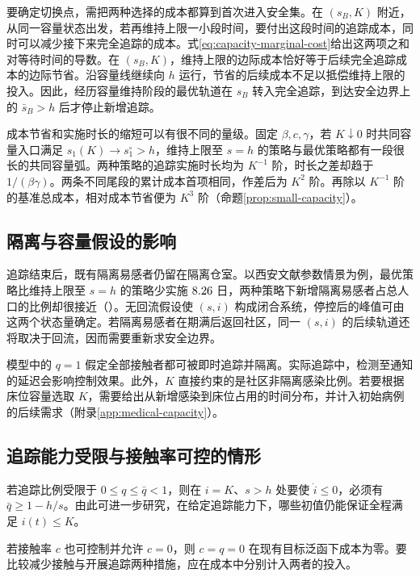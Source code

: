 \documentclass[lang=cn,a4paper,newtx]{elegantpaper}
\theoremstyle{plain}
\theoremstyle{definition}
\newcommand{\Dur}[1]{\num[round-mode=places,round-precision=2]{#1}}
\begin{document}
要确定切换点，需把两种选择的成本都算到首次进入安全集。在 $(s_B,K)$ 附近，从同一容量状态出发，若再维持上限一小段时间，要付出这段时间的追踪成本，同时可以减少接下来完全追踪的成本。式\eqref{eq:capacity-marginal-cost}给出这两项之和对等待时间的导数。在 $(s_B,K)$，维持上限的边际成本恰好等于后续完全追踪成本的边际节省。沿容量线继续向 $h$ 运行，节省的后续成本不足以抵偿维持上限的投入。因此，经历容量维持阶段的最优轨道在 $s_B$ 转入完全追踪，到达安全边界上的 $\bar s_B>h$ 后才停止新增追踪。

成本节省和实施时长的缩短可以有很不同的量级。固定 $\beta,c,\gamma$，若 $K\downarrow0$ 时共同容量入口满足 $s_1(K)\to s_1^\circ>h$，维持上限至 $s=h$ 的策略与最优策略都有一段很长的共同容量弧。两种策略的追踪实施时长均为 $K^{-1}$ 阶，时长之差却趋于 $1/(\beta\gamma)$。两条不同尾段的累计成本首项相同，作差后为 $K^2$ 阶。再除以 $K^{-1}$ 阶的基准总成本，相对成本节省便为 $K^3$ 阶（命题\ref{prop:small-capacity}）。

\subsection{隔离与容量假设的影响}
\label{sec:limitations}
追踪结束后，既有隔离易感者仍留在隔离仓室。以西安文献参数情景为例，最优策略比维持上限至 $s=h$ 的策略少实施 $\Dur{\DtimeDeltaZ}$ 日，两种策略下新增隔离易感者占总人口的比例却很接近（）。无回流假设使 $(s,i)$ 构成闭合系统，停控后的峰值可由这两个状态量确定。若隔离易感者在期满后返回社区，同一 $(s,i)$ 的后续轨道还将取决于回流，因而需要重新求安全边界。

模型中的 $q=1$ 假定全部接触者都可被即时追踪并隔离。实际追踪中，检测至通知的延迟会影响控制效果\parencite{Kretzschmar2020}。此外，$K$ 直接约束的是社区非隔离感染比例。若要根据床位容量选取 $K$，需要给出从新增感染到床位占用的时间分布，并计入初始病例的后续需求（附录\ref{app:medical-capacity}）。

\subsection{追踪能力受限与接触率可控的情形}
\label{sec:open-problems}
若追踪比例受限于 $0\le q\le\bar q<1$，则在 $i=K$、$s>h$ 处要使 $\dot i\le0$，必须有 $\bar q\ge1-h/s$。由此可进一步研究，在给定追踪能力下，哪些初值仍能保证全程满足 $i(t)\le K$。

若接触率 $c$ 也可控制并允许 $c=0$，则 $c=q=0$ 在现有目标泛函下成本为零。要比较减少接触与开展追踪两种措施，应在成本中分别计入两者的投入。

\appendix
\end{document}
